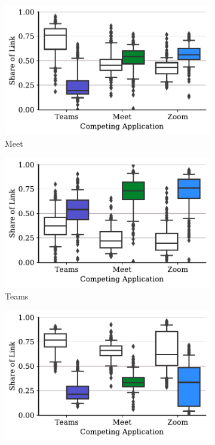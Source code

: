\begin{figure}[t!]
\centering
\begin{subfigure}[t]{.33\textwidth}
    \centering
    \includegraphics[width=1\textwidth]{figures/comp/box_plot_meet_dl_0.5_all.pdf}
    \caption{Meet}
    \label{fig:meet-dl-boxplot-0.5}
\end{subfigure}\hfill
\begin{subfigure}[t]{.33\textwidth}
    \centering
    \includegraphics[width=1\textwidth]{figures/comp/box_plot_teams_dl_0.5_all.pdf}
    \caption{Teams}
    \label{fig:teams-dl-boxplot-0.5}
\end{subfigure}
\begin{subfigure}[t]{.33\textwidth}
    \centering
    \includegraphics[width=1\textwidth]{figures/comp/box_plot_zoom_dl_0.5_all.pdf}

\end{subfigure}
\end{figure}

